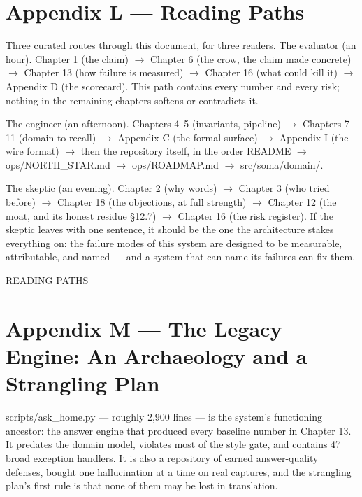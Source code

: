 \chapter*{Appendix L --- Reading Paths}\label{appendix-l-reading-paths}

Three curated routes through this document, for three readers. The evaluator (an hour). Chapter 1 (the claim) \(\rightarrow\) Chapter 6 (the crow, the claim made concrete) \(\rightarrow\) Chapter 13 (how failure is measured) \(\rightarrow\) Chapter 16 (what could kill it) \(\rightarrow\) Appendix D (the scorecard). This path contains every number and every risk; nothing in the remaining chapters softens or contradicts it.

The engineer (an afternoon). Chapters 4--5 (invariants, pipeline) \(\rightarrow\) Chapters 7--11 (domain to recall) \(\rightarrow\) Appendix C (the formal surface) \(\rightarrow\) Appendix I (the wire format) \(\rightarrow\) then the repository itself, in the order README \(\rightarrow\) ops/NORTH\_STAR.md \(\rightarrow\) ops/ROADMAP.md \(\rightarrow\) src/soma/domain/.

The skeptic (an evening). Chapter 2 (why words) \(\rightarrow\) Chapter 3 (who tried before) \(\rightarrow\) Chapter 18 (the objections, at full strength) \(\rightarrow\) Chapter 12 (the moat, and its honest residue \S{}12.7) \(\rightarrow\) Chapter 16 (the risk register). If the skeptic leaves with one sentence, it should be the one the architecture stakes everything on: the failure modes of this system are designed to be measurable, attributable, and named --- and a system that can name its failures can fix them.

READING PATHS

\chapter*{Appendix M --- The Legacy Engine: An Archaeology and a Strangling Plan}\label{appendix-m-the-legacy-engine-an-archaeology-and-a-strangling-plan}

scripts/ask\_home.py --- roughly 2,900 lines --- is the system's functioning ancestor: the answer engine that produced every baseline number in Chapter 13. It predates the domain model, violates most of the style gate, and contains 47 broad exception handlers. It is also a repository of earned answer-quality defenses, bought one hallucination at a time on real captures, and the strangling plan's first rule is that none of them may be lost in translation.

